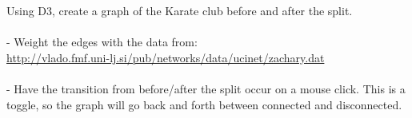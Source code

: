 Using D3, create a graph of the Karate club before and after
the split.\\
\\
- Weight the edges with the data from:\\ 
\url{http://vlado.fmf.uni-lj.si/pub/networks/data/ucinet/zachary.dat}\\
\\
- Have the transition from before/after the split occur on a mouse
click.  This is a toggle, so the graph will go back and forth between
connected and disconnected.
